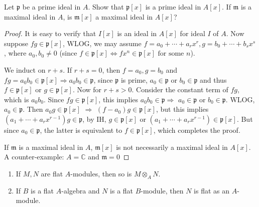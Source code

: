 \documentclass{solution}
\begin{document}
\begin{problem}
    Let $\mathfrak{p}$ be a prime ideal in $A$. Show that $\mathfrak{p}[x]$ is a prime ideal in $A[x]$. If $\mathfrak{m}$ is a maximal ideal in $A$, is $\mathfrak{m}[x]$ a maximal ideal in $A[x]$?
\end{problem}

\begin{proof}
    It is easy to verify that $I[x]$ is an ideal in $A[x]$ for ideal $I$ of $A$. Now suppose $fg \in \mathfrak{p}[x]$, WLOG, we may assume $f = a_0 + \cdots + a_rx^r, g = b_0 + \cdots + b_sx^s$, where $a_0, b_0 \ne 0$ (since $f \in \mathfrak{p}[x] \Leftrightarrow fx^n \in \mathfrak{p}[x] \text{ for some $n$}$).

    We induct on $r + s$. If $r + s = 0$, then $f = a_0, g = b_0$ and $fg = a_0b_0 \in \mathfrak{p}[x] \Rightarrow a_0b_0 \in \mathfrak{p}$, since $\mathfrak{p}$ is prime, $a_0 \in \mathfrak{p}$ or $b_0 \in \mathfrak{p}$ and thus $f \in \mathfrak{p}[x]$ or $g \in \mathfrak{p}[x]$. Now for $r + s \gt 0$. Consider the constant term of $fg$, which is $a_0b_0$. Since $f g \in \mathfrak{p}[x]$, this implies $a_0b_0 \in \mathfrak{p} \Rightarrow$ $a_0 \in \mathfrak{p}$ or $b_0 \in \mathfrak{p}$. WLOG, $a_0 \in \mathfrak{p}$. Then $a_0 g \in \mathfrak{p}[x]$ $\Rightarrow$ $(f - a_0) g \in \mathfrak{p}[x]$, but this implies $(a_1 + \cdots + a_rx^{r - 1})g \in \mathfrak{p}$, by IH, $g \in \mathfrak{p}[x]$ or $(a_1 + \cdots + a_rx^{r - 1}) \in \mathfrak{p}[x]$. But since $a_0 \in \mathfrak{p}$, the latter is equivalent to $f \in \mathfrak{p}[x]$, which completes the proof.

    If $\mathfrak{m}$ is a maximal ideal in $A$, $\mathfrak{m}[x]$ is not necessarily a maximal ideal in $A[x]$. A counter-example: $A = \mathbb{C}$ and $\mathfrak{m} = 0$
\end{proof}

\begin{problem}
    \begin{enumerate}
        \item If $M, N$ are flat $A$-modules, then so is $M \otimes_A N$.
        \item If $B$ is a flat $A$-algebra and $N$ is a flat $B$-module, then $N$ is flat as an $A$-module.
    \end{enumerate}
\end{problem}
\end{document}
